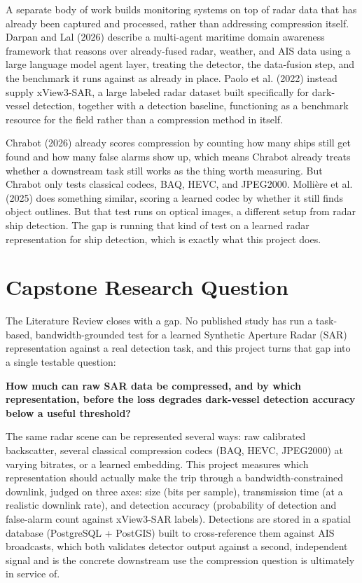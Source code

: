 \documentclass[11pt]{article}
\begin{document}
A separate body of work builds monitoring systems on top of radar data that has already been captured and processed, rather than addressing compression itself. Darpan and Lal (2026) describe a multi-agent maritime domain awareness framework that reasons over already-fused radar, weather, and AIS data using a large language model agent layer, treating the detector, the data-fusion step, and the benchmark it runs against as already in place. Paolo et al. (2022) instead supply xView3-SAR, a large labeled radar dataset built specifically for dark-vessel detection, together with a detection baseline, functioning as a benchmark resource for the field rather than a compression method in itself.

Chrabot (2026) already scores compression by counting how many ships still get found and how many false alarms show up, which means Chrabot already treats whether a downstream task still works as the thing worth measuring. But Chrabot only tests classical codecs, BAQ, HEVC, and JPEG2000. Molli\`ere et al. (2025) does something similar, scoring a learned codec by whether it still finds object outlines. But that test runs on optical images, a different setup from radar ship detection. The gap is running that kind of test on a learned radar representation for ship detection, which is exactly what this project does.

\section{Capstone Research Question}

The Literature Review closes with a gap. No published study has run a task-based, bandwidth-grounded test for a learned Synthetic Aperture Radar (SAR) representation against a real detection task, and this project turns that gap into a single testable question:

\textbf{How much can raw SAR data be compressed, and by which representation, before the loss degrades dark-vessel detection accuracy below a useful threshold?}

The same radar scene can be represented several ways: raw calibrated backscatter, several classical compression codecs (BAQ, HEVC, JPEG2000) at varying bitrates, or a learned embedding. This project measures which representation should actually make the trip through a bandwidth-constrained downlink, judged on three axes: size (bits per sample), transmission time (at a realistic downlink rate), and detection accuracy (probability of detection and false-alarm count against xView3-SAR labels). Detections are stored in a spatial database (PostgreSQL + PostGIS) built to cross-reference them against AIS broadcasts, which both validates detector output against a second, independent signal and is the concrete downstream use the compression question is ultimately in service of.
\end{document}
